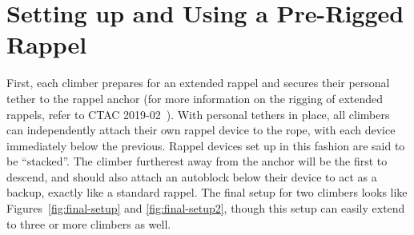 \documentclass[nonacm,acmtog]{acmart}
\begin{document}
\section{Setting up and Using a Pre-Rigged Rappel}
\label{sec:setup}

  First, each climber prepares for an extended rappel and secures their
  personal tether to the rappel anchor (for more information on the rigging of
  extended rappels, refer to CTAC 2019-02~\cite{ctac:2019-2}).  With personal
  tethers in place, all climbers can independently attach their own rappel
  device to the rope, with each device immediately below the previous.  Rappel
  devices set up in this fashion are said to be ``stacked''. The climber
  furtherest away from the anchor will be the first to descend, and should
  also attach an autoblock below their device to act as a backup, exactly like
  a standard rappel.  The final setup for two climbers looks like
  Figures~\ref{fig:final-setup} and \ref{fig:final-setup2}, though this setup
  can easily extend to three or more climbers as well.
\end{document}

